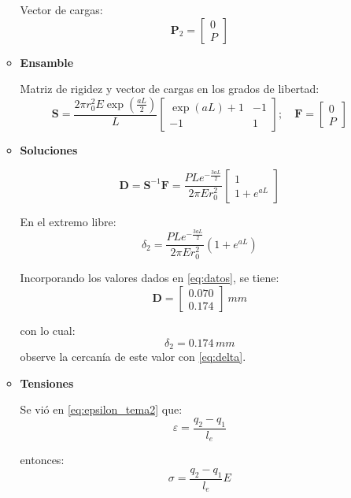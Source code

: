 \begin{example}
\begin{enumerate}[label=\textbf{\arabic*}.]
\begin{itemize}
Vector de cargas:
$$
\mathbf{P}_2 = \begin{bmatrix}
	0 \\ P
\end{bmatrix}
$$

\item \textbf{Ensamble}

Matriz de rigidez y vector de cargas en los grados de libertad:
$$\mathbf{S} = \dfrac{2\pi r_0^2 E \exp \left( \frac{aL}{2} \right)}{L} \left[ \begin{array}{cc}
	\exp \left(aL\right) + 1 & -1 \\[4mm] -1 & 1
\end{array} \right]; \quad \mathbf{F} = \begin{bmatrix} 0 \\ P \end{bmatrix}$$

\item \textbf{Soluciones}

\begin{equation}
	\mathbf{D} = \mathbf{S}^{-1} \mathbf{F} = \dfrac{PLe^{-\frac{3aL}{2}}}{2\pi E r_0^2} \left[\begin{matrix} 1\\[4mm] 1 + e^{aL}\end{matrix}\right]
	\label{eq:D}
\end{equation}

En el extremo libre:
\begin{equation}
	\boxed{\delta_2 = \dfrac{PLe^{-\frac{3aL}{2}}}{2\pi E r_0^2} \left( 1 + e^{aL} \right)}
\end{equation}

Incorporando los valores dados en \eqref{eq:datos}, se tiene:
$$
\mathbf{D} = \begin{bmatrix}
	0.070 \\[1mm] 0.174
\end{bmatrix} \ \unit{mm}
$$

con lo cual:
\begin{equation}
	\delta_2 = 0.174 \, \unit{mm}
	\label{eq:delta2}
\end{equation} observe la cercanía de este valor  con \eqref{eq:delta}.

\item \textbf{Tensiones}

Se vió en \eqref{eq:epsilon_tema2} que:
$$
\varepsilon = \dfrac{q_2 - q_1}{l_e}
$$

entonces:
\begin{equation}
	\sigma = \dfrac{q_2 - q_1}{l_e}E
	\label{eq:sigma2}
\end{equation}


\end{itemize}
\end{enumerate}
\end{example}
